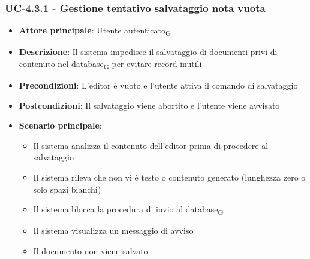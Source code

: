 \documentclass[11pt,a4paper]{article}
\newcommand{\gls}[1]{#1\textsubscript{G}}
\begin{document}
\subsubsection{UC-4.3.1 - Gestione tentativo salvataggio nota vuota}
\begin{itemize}
    \item \textbf{Attore principale}: \gls{Utente autenticato}
    \item \textbf{Descrizione}: Il sistema impedisce il salvataggio di documenti privi di contenuto nel \gls{database} per evitare record inutili
    \item \textbf{Precondizioni}: L’editor è vuoto e l'utente attiva il comando di salvataggio
    \item \textbf{Postcondizioni}: Il salvataggio viene abortito e l'utente viene avvisato
    \item \textbf{Scenario principale}:
    \begin{itemize}
        \item Il sistema analizza il contenuto dell'editor prima di procedere al salvataggio
        \item Il sistema rileva che non vi è testo o contenuto generato (lunghezza zero o solo spazi bianchi)
        \item Il sistema blocca la procedura di invio al \gls{database}
        \item Il sistema visualizza un messaggio di avviso
        \item Il documento non viene salvato
    \end{itemize}
\end{itemize}
\end{document}
